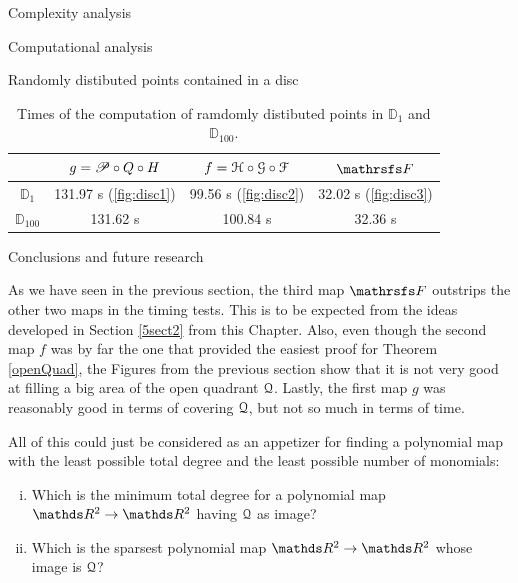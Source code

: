 \documentclass[11pt, a4paper, english, twoside, notitlepage, openright]{report}
\begin{document}
\begin{chapter}{Complexity analysis}
\begin{section}{Computational analysis}
\begin{subsection}{Randomly distibuted points contained in a disc}
\vspace{0.2cm}

\begin{table}[ht!]
\begin{center}
\begin{tabular}{c || c | c | c}
& $g = \P\circ Q \circ H$ & $f=\HH\circ\GG\circ\FF$ & $\FFF$ \\ \hline \hline
${\mathbb D}_1$ & 131.97 s (\ref{fig:disc1}) & 99.56 s (\ref{fig:disc2}) & 32.02 s (\ref{fig:disc3}) \\ \hline
${\mathbb D}_{100}$ & 131.62 s & 100.84 s & 32.36 s \\
\end{tabular}
\caption[Times of the computation of points contained in ${\mathbb D}_{1}$ and ${\mathbb D}_{100}$.]{Times of the computation of ramdomly distibuted points in ${\mathbb D}_{1}$ and ${\mathbb D}_{100}$.}\label{tab:disc}
\end{center}
\end{table}

\end{subsection}

\end{section}

\begin{section}{Conclusions and future research}\label{5sect4}

As we have seen in the previous section, the third map $\FFF$ outstrips the other two maps in the timing tests. This is to be expected from the ideas developed in Section \ref{5sect2} from this Chapter. Also, even though the second map $f$ was by far the one that provided the easiest proof for Theorem \ref{openQuad}, the Figures from the previous section show that it is not very good at filling a big area of the open quadrant $\Qu$. Lastly, the first map $g$ was reasonably good in terms of covering $\Qu$, but not so much in terms of time.

All of this could just be considered as an appetizer for finding a polynomial map with the least possible total degree and the least possible number of monomials:
\begin{problem}
\begin{enumerate}[(i)]
\item Which is the minimum total degree for a polynomial map $\R^2 \to \R^2$ having $\Qu$ as image?
\item Which is the sparsest polynomial map $\R^2 \to \R^2$ whose image is $\Qu$?
\end{enumerate}
\end{problem}


\end{section}
\end{chapter}
\end{document}
